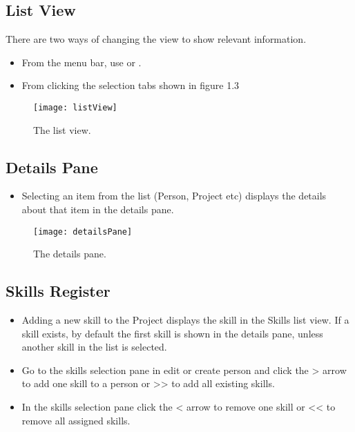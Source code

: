 \documentclass[11pt,fleqn]{book} %
\begin{document}
\pagebreak

\subsection{List View}
There are two ways of changing the view to show relevant information.
\begin{itemize}
  \item From the menu bar, use  or .
  \item From clicking the selection tabs shown in figure 1.3
\end{itemize}

\begin{figure}[H]
  \centering
  \texttt{[image: listView]}
  \caption{The list view.\label{listView}}
\end{figure}

\subsection{Details Pane}
\begin{itemize}
  \item Selecting an item from the list (Person, Project etc) displays the details about that item in the details pane.
\end{itemize}

\begin{figure}[H]
  \centering
  \texttt{[image: detailsPane]}
  \caption{The details pane.\label{detailsPane}}
\end{figure}

\pagebreak

\subsection{Skills Register}
\begin{itemize}
  \item Adding a new skill to the Project displays the skill in the Skills list view. If a skill exists, by default the first skill is shown in the details pane, unless another skill in the list is selected. 
  \item Go to the skills selection pane in edit or create person and click the > arrow to add one skill to a person or >> to add all existing skills.
  \item In the skills selection pane click the < arrow to remove one skill or << to remove all assigned skills. 
\end{itemize}
\end{document}
